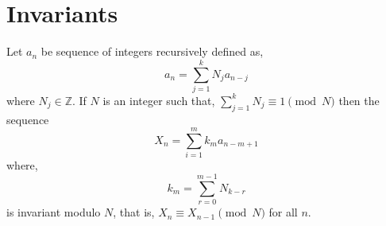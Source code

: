 \chapter{Invariants}

\begin{proposition}
    Let $a_{n}$ be sequence of integers recursively defined as,
    \[
        a_{n} = \sum_{j=1}^{k} N_{j} a_{n-j}
    \]
    where $N_{j} \in \mathbb{Z}$. If $N$ is an integer such that, 
    $\sum_{j=1}^{k} N_{j} \equiv 1 \pmod{N}$ then the sequence
    \[
        X_{n} = \sum_{i=1}^{m} k_{m} a_{n-m+1}
    \]
    where,
    \[
        k_{m} = \sum_{r=0}^{m-1} N_{k-r}
    \]
    is invariant modulo $N$, that is, $X_{n} \equiv X_{n-1} \pmod{N}$ for all $n$.
\end{proposition}
